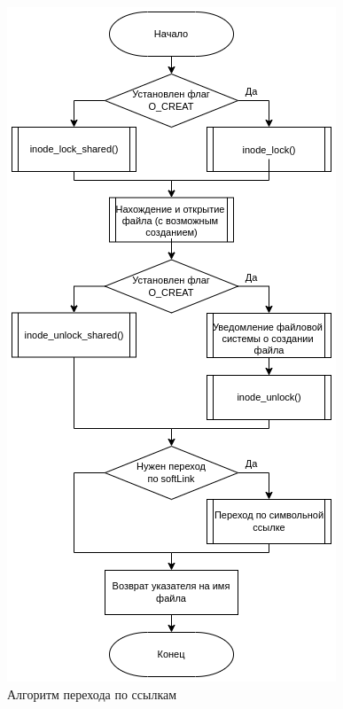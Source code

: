 \documentclass[12pt,a4paper]{scrreprt}
\begin{document}
\begin{figure}[H]
	\centering
	\includegraphics[scale=0.7]{pics/open_last_lookups.png}
	\caption{Алгоритм перехода по ссылкам}
\end{figure}
\end{document}
